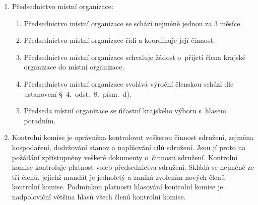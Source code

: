 \documentclass[a4paper]{article}
\begin{document}
\begin{enumerate}
    \item Předsednictvo místní organizace:
        \begin{enumerate}
        \item Předsednictvo místní organizace se schází nejméně jednou za
            3 měsíce.

        \item Předsednictvo místní organizace řídí a koordinuje její činnost.

        \item Předsednictvo místní organizace schvaluje žádost o~přijetí
            člena krajské organizace do místní organizace.

        \item Předsednictvo místní organizace svolává výroční členskou
            schůzi dle ustanovení \S~4.~odst.~8.~písm.~d).

        \item Předseda místní organizace se účastní krajského výboru
            s~hlasem poradním.
        \end{enumerate}

    \item Kontrolní komise je oprávněna kontrolovat veškerou činnost sdružení,
        zejména hospodaření, dodržování stanov a naplňování cílů sdružení.
        Jsou jí proto na požádání zpřístupněny veškeré dokumenty o~činnosti
        sdružení. Kontrolní komise kontroluje platnost voleb předsednictva
        sdružení. Skládá se nejméně ze tří členů, jejichž mandát je jednoletý
        a zaniká zvolením nových členů kontrolní komise. Podmínkou platnosti
        hlasování kontrolní komise je nadpoloviční většina hlasů všech členů
        kontrolní komise.
    \end{enumerate}
\end{document}
